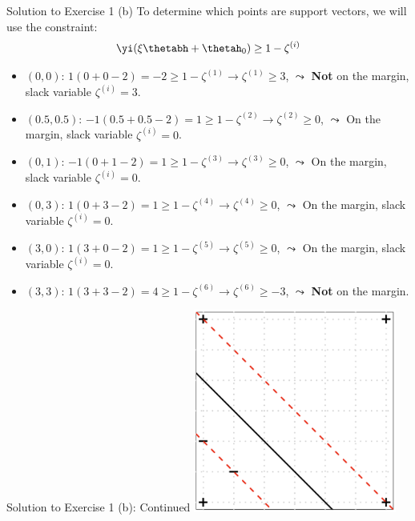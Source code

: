 \documentclass[aspectratio=169]{beamer}
\newcommand{\zetai}{\zeta^{(i)}}
\begin{document}
\begin{frame}{Solution to Exercise 1 (b)}
	To determine which points are support vectors, we will use the constraint:
	\begin{align*}
		\yi (\xi \thetabh + \thetah_0) \geq 1 - \zetai 
	\end{align*}
	\small
	\begin{itemize}
		\item<2-> $(0,0)$: $1 (0 + 0 - 2) = -2 \geq 1 - \zeta^{(1)} \rightarrow \zeta^{(1)} \geq 3$, $\leadsto$ \textbf{Not} on the margin,  slack variable $\zetai = 3$.
		\item<3-> $(0.5, 0.5)$: $-1 (0.5 + 0.5 - 2) = 1 \geq 1 - \zeta^{(2)} \rightarrow \zeta^{(2)} \geq 0$, $\leadsto$ On the margin, slack variable $\zetai = 0 $.
		\item<4-> $(0, 1)$: $ -1 (0 + 1 - 2) = 1 \geq 1 - \zeta^{(3)} \rightarrow \zeta^{(3)} \geq 0$, $\leadsto$ On the margin, slack variable $\zetai = 0$.
		\item<5-> $(0, 3)$: $ 1 (0 + 3 - 2) = 1 \geq 1 - \zeta^{(4)} \rightarrow \zeta^{(4)} \geq 0$, $\leadsto$ On the margin, slack variable $\zetai = 0$.
		\item<6-> $(3, 0)$: $ 1 (3 + 0 - 2) = 1 \geq 1 - \zeta^{(5)} \rightarrow \zeta^{(5)} \geq 0$, $\leadsto$ On the margin, slack variable $\zetai = 0$.
		\item<7-> $(3, 3)$: $ 1 (3 + 3 - 2) = 4 \geq 1 - \zeta^{(6)} \rightarrow \zeta^{(6)} \geq -3 $, $\leadsto$ \textbf{Not} on the margin.
	\end{itemize}
\end{frame}

\begin{frame}{Solution to Exercise 1 (b): Continued}
	\centering
	\includegraphics[width=0.5\textwidth]{figures/ex_1_b.png}
\end{frame}

\end{document}

